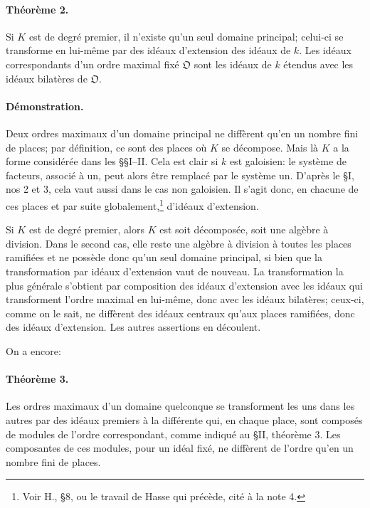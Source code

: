 \paragraph{Théorème 2.}
Si \(K\) est de degré premier, il n'existe qu'un seul domaine principal; celui-ci se transforme en lui-même par des idéaux d'extension des idéaux de \(k\). Les idéaux correspondants d'un ordre maximal fixé \(\mathfrak O\) sont les idéaux de \(k\) étendus avec les idéaux bilatères de \(\mathfrak O\).

\paragraph{Démonstration.}
Deux ordres maximaux d'un domaine principal ne diffèrent qu'en un nombre fini de places; par définition, ce sont des places où \(K\) se décompose. Mais là \(K\) a la forme considérée dans les \S{}\S{}I--II. Cela est clair si \(k\) est galoisien: le système de facteurs, associé à un, peut alors être remplacé par le système un. D'après le \S{}I, nos 2 et 3, cela vaut aussi dans le cas non galoisien. Il s'agit donc, en chacune de ces places et par suite globalement,\footnote{Voir H., \S{}8, ou le travail de Hasse qui précède, cité à la note 4.} d'idéaux d'extension.

Si \(K\) est de degré premier, alors \(K\) est soit décomposée, soit une algèbre à division. Dans le second cas, elle reste une algèbre à division à toutes les places ramifiées et ne possède donc qu'un seul domaine principal, si bien que la transformation par idéaux d'extension vaut de nouveau. La transformation la plus générale s'obtient par composition des idéaux d'extension avec les idéaux qui transforment l'ordre maximal en lui-même, donc avec les idéaux bilatères; ceux-ci, comme on le sait, ne diffèrent des idéaux centraux qu'aux places ramifiées, donc des idéaux d'extension. Les autres assertions en découlent.

On a encore:

\paragraph{Théorème 3.}
Les ordres maximaux d'un domaine quelconque se transforment les uns dans les autres par des idéaux premiers à la différente qui, en chaque place, sont composés de modules de l'ordre correspondant, comme indiqué au \S{}II, théorème 3. Les composantes de ces modules, pour un idéal fixé, ne diffèrent de l'ordre qu'en un nombre fini de places.

